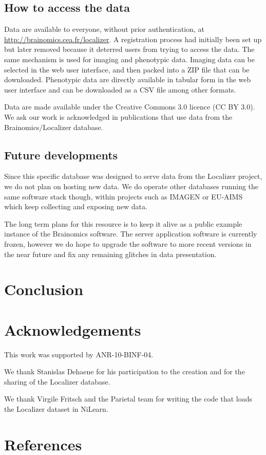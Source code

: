 \documentclass[review]{elsarticle}
\begin{document}
\subsection{How to access the data}

Data are available to everyone, without prior authentication, at \url{http://brainomics.cea.fr/localizer}. A registration process had initially been set up but later removed because it deterred users from trying to access the data. The same mechanism is used for imaging and phenotypic data. Imaging data can be selected in the web user interface, and then packed into a ZIP file that can be downloaded. Phenotypic data are directly available in tabular form in the web user interface and can be downloaded as a CSV file among other formats.

Data are made available under the Creative Commons 3.0 licence (CC BY 3.0). We ask our work is acknowledged in publications that use data from the Brainomics/Localizer database.


\subsection{Future developments}

Since this specific database was designed to serve data from the Localizer project, we do not plan on hosting new data. We do operate other databases running the same software stack though, within projects such as IMAGEN \cite{Imagen2010} or EU-AIMS \cite{Aims2014} which keep collecting and exposing new data.

The long term plans for this resource is to keep it alive as a public example instance of the {Brainomics} software. The server application software is currently frozen, however we do hope to upgrade the software to more recent versions in the near future and fix any remaining glitches in data presentation.


\section{Conclusion}

\section{Acknowledgements}

This work was supported by ANR-10-BINF-04.

We thank Stanislas Dehaene for his participation to the creation and for the sharing of the Localizer database. 

We thank Virgile Fritsch and the Parietal team for writing the code that loads the Localizer dataset in NiLearn.


\section*{References}


\end{document}
